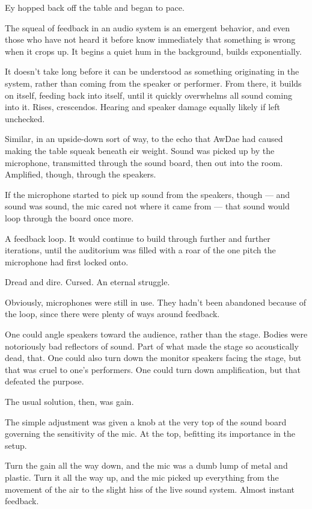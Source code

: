 Ey hopped back off the table and began to pace.

The squeal of feedback in an audio system is an emergent behavior, and even those who have not heard it before know immediately that something is wrong when it crops up. It begins a quiet hum in the background, builds exponentially.

It doesn't take long before it can be understood as something originating in the system, rather than coming from the speaker or performer. From there, it builds on itself, feeding back into itself, until it quickly overwhelms all sound coming into it. Rises, crescendos. Hearing and speaker damage equally likely if left unchecked.

Similar, in an upside-down sort of way, to the echo that AwDae had caused making the table squeak beneath eir weight. Sound was picked up by the microphone, transmitted through the sound board, then out into the room. Amplified, though, through the speakers.

If the microphone started to pick up sound from the speakers, though --- and sound was sound, the mic cared not where it came from --- that sound would loop through the board once more.

A feedback loop. It would continue to build through further and further iterations, until the auditorium was filled with a roar of the one pitch the microphone had first locked onto.

Dread and dire. Cursed. An eternal struggle.

Obviously, microphones were still in use. They hadn't been abandoned because of the loop, since there were plenty of ways around feedback.

One could angle speakers toward the audience, rather than the stage. Bodies were notoriously bad reflectors of sound. Part of what made the stage so acoustically dead, that. One could also turn down the monitor speakers facing the stage, but that was cruel to one's performers. One could turn down amplification, but that defeated the purpose.

The usual solution, then, was gain.

The simple adjustment was given a knob at the very top of the sound board governing the sensitivity of the mic. At the top, befitting its importance in the setup.

Turn the gain all the way down, and the mic was a dumb lump of metal and plastic. Turn it all the way up, and the mic picked up everything from the movement of the air to the slight hiss of the live sound system. Almost instant feedback.

